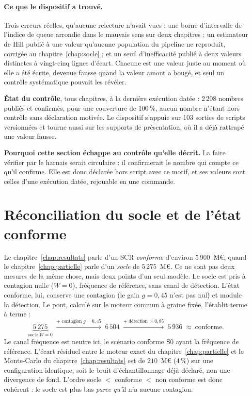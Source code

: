 \paragraph{Ce que le dispositif a trouvé.} Trois erreurs réelles, qu'aucune relecture n'avait
vues : une borne d'intervalle de l'indice de queue arrondie dans le mauvais sens sur deux
chapitres ; un estimateur de Hill publié à une valeur qu'aucune population du pipeline ne
reproduit, corrigée au chapitre~\ref{chap:socle} ; et un seuil d'inefficacité publié à deux valeurs
distinctes à vingt-cinq lignes d'écart. Chacune est une valeur juste au moment où elle a été
écrite, devenue fausse quand la valeur amont a bougé, et seul un contrôle systématique pouvait les
révéler.

\begin{cle}
\textbf{État du contrôle}, tous chapitres, à la dernière exécution datée : 2\,208 nombres publiés
et confirmés, pour une couverture de $100\,\%$, aucun nombre n'étant hors contrôle sans
déclaration motivée. Le dispositif s'appuie sur 103 sorties de scripts versionnées et tourne aussi
sur les supports de présentation, où il a déjà rattrapé une valeur fausse.

\textbf{Pourquoi cette section échappe au contrôle qu'elle décrit.} La faire vérifier par le
harnais serait circulaire : il confirmerait le nombre qui compte ce qu'il confirme. Elle est donc
déclarée hors script avec ce motif, et ses valeurs sont celles d'une exécution datée, rejouable en
une commande.
\end{cle}

\section{Réconciliation du socle et de l'état conforme}
\label{sec:ann-reconciliation}

Le chapitre~\ref{chap:resultats} parle d'un SCR \emph{conforme} d'environ $5\,900$~M\euro{},
quand le chapitre~\ref{chap:partielle} parle d'un \emph{socle} de $5\,275$~M\euro{}. Ce ne
sont pas deux mesures de la même chose, mais deux points d'un seul modèle. Le socle est pris à
contagion nulle ($W=0$), fréquence de référence, sans canal de détection. L'état
conforme, lui, conserve une contagion (le gain $g=0{,}45$ n'est pas nul) et module la
détection. Le pont, calculé sur le moteur commun à graine fixée, l'établit terme à terme :
\[
  \underbrace{5\,275}_{\text{socle }W=0}\;\xrightarrow{+\text{ contagion }g=0{,}45}\;6\,504
  \;\xrightarrow{+\text{ détection }\times 0{,}85}\;5\,936\;\approx\;\text{conforme}.
\]
Le canal fréquence est neutre ici, le scénario conforme S0 ayant la fréquence de référence.
L'écart résiduel entre le moteur exact du chapitre~\ref{chap:partielle} et le Monte-Carlo du
chapitre~\ref{chap:resultats} est de $210$~M\euro{} ($4\,\%$) sur une configuration identique,
soit le bruit d'échantillonnage déjà déclaré, non une divergence de fond. L'ordre socle $<$
conforme $<$ non conforme est donc cohérent : le socle est plus bas \emph{parce qu'}il n'a
aucune contagion.

